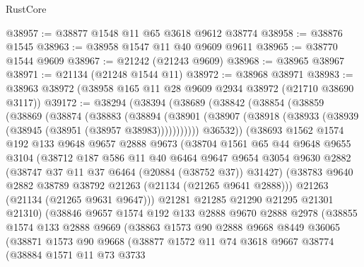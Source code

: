 \begin{lexlean}{RustCore}
\begin{coremodule}
@38957 := @38877 @1548 @11 @65 @3618 @9612 @38774
@38958 := @38876 @1545
@38963 := @38958 @1547 @11 @40 @9609 @9611
@38965 := @38770 @1544 @9609
@38967 := @21242 (@21243 @9609)
@38968 := @38965 @38967
@38971 := @21134 (@21248 @1544 @11)
@38972 := @38968 @38971
@38983 := @38963 @38972 (@38958 @165 @11 @28 @9609 @2934 @38972 (@21710 @38690 @3117))
@39172 := @38294
    (@38394
      (@38689
        (@38842
          (@38854
            (@38859
              (@38869
                (@38874
                  (@38883
                    (@38894
                      (@38901
                        (@38907 (@38918 (@38933 (@38939 (@38945 (@38951 (@38957 @38983)))))))))))
                @36532))
            (@38693
              @1562
              @1574
              @192
              @133
              @9648
              @9657
              @2888
              @9673
              (@38704
                @1561
                @65
                @44
                @9648
                @9655
                @3104
                (@38712
                  @187
                  @586
                  @11
                  @40
                  @6464
                  @9647
                  @9654
                  @3054
                  @9630
                  @2882
                  (@38747 @37 @11 @37 @6464 (@20884 (@38752 @37)) @31427)
                  (@38783 @9640 @2882 @38789 @38792 @21263 (@21134 (@21265 @9641 @2888)))
                  @21263
                  (@21134 (@21265 @9631 @9647)))
                @21281
                @21285
                @21290
                @21295
                @21301
                @21310)
              (@38846
                @9657
                @1574
                @192
                @133
                @2888
                @9670
                @2888
                @2978
                (@38855
                  @1574
                  @133
                  @2888
                  @9669
                  (@38863
                    @1573
                    @90
                    @2888
                    @9668
                    @8449
                    @36065
                    (@38871
                      @1573
                      @90
                      @9668
                      (@38877
                        @1572
                        @11
                        @74
                        @3618
                        @9667
                        @38774
                        (@38884
                          @1571
                          @11
                          @73
                          @3733

\end{coremodule}
\end{lexlean}

